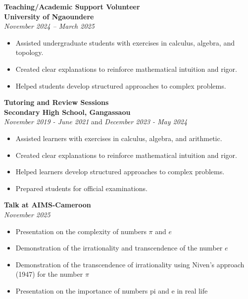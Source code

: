 \documentclass[10pt, a4paper]{article}
\begin{document}
		\vspace{0.2cm}
	
	\textbf{Teaching/Academic Support Volunteer} \\
	\textbf{University of Ngaoundere} \\
	\textit{November 2024 – March 2025}
	\begin{itemize}
		\item Assisted undergraduate students with exercises in calculus, algebra, and topology.
		\item Created clear explanations to reinforce mathematical intuition and rigor.
		\item Helped students develop structured approaches to complex problems.
	\end{itemize}
	
	\vspace{0.2cm}
	
	\textbf{Tutoring and Review Sessions} \\
	\textbf{Secondary High School, Gangassaou} \\
	\textit{November 2019 - June 2021} and \textit{December 2023 - May 2024}
	\begin{itemize}
		\item Assisted learners with exercises in calculus, algebra, and arithmetic.
		\item Created clear explanations to reinforce mathematical intuition and rigor.
		\item Helped learners develop structured approaches to complex problems.
		\item Prepared students for official examinations.
	\end{itemize}
	
	\vspace{0.2cm}
	
	\textbf{Talk at AIMS-Cameroon} \\
	\textit{November 2025}
	\begin{itemize}
		\item Presentation on the complexity of numbers $\pi$ and $e$
		\item Demonstration of the irrationality and transcendence of the number $e$
		\item Demonstration of the transcendence of irrationality using Niven's approach (1947) for the number $\pi$
		\item Presentation on the importance of numbers pi and e in real life
	\end{itemize}
	
\end{document}
